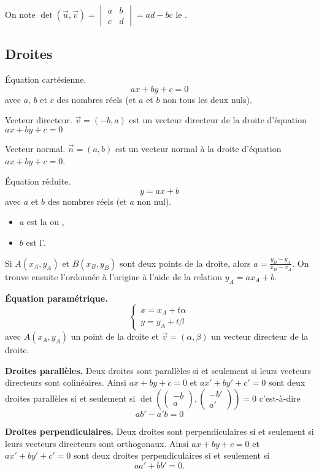 \documentclass[10pt,class=article,crop=false]{standalone}
\begin{document}
\begin{multicols}{2}
On note $\det (\vec u, \vec v) = \begin{vmatrix}
a & b \\
c & d
\end{vmatrix}
= ad - bc$ le .


\subsection{Droites}

Équation cartésienne. 
$$ax+by+c=0$$
avec $a$, $b$ et $c$ des nombres réels (et $a$ et $b$ non tous les deux nuls).

Vecteur directeur. $\vec v = (-b,a)$ est un vecteur directeur de la droite d'équation $ax+by+c=0$

Vecteur normal. $\vec n = (a,b)$ est un vecteur normal à la droite d'équation $ax+by+c=0$.


Équation réduite.
$$y = ax+b$$
avec $a$ et $b$ des nombres réels (et $a$ non nul).
\begin{itemize}
    \item $a$ est la  ou ,
    \item $b$ est l'.
\end{itemize}

Si $A(x_A,y_A)$ et $B(x_B,y_B)$ sont deux points de la droite, alors $a = \frac{y_B-y_A}{x_B-x_A}$.
On trouve ensuite l'ordonnée à l'origine à l'aide de la relation $y_A = a x_A+b$.

\textbf{Équation paramétrique.}
$$\begin{cases}
x = x_A + t \alpha \\
y = y_A + t \beta
\end{cases}$$
avec $A(x_A,y_A)$ un point de la droite et $\vec v = (\alpha,\beta)$ un vecteur directeur de la droite.


\textbf{Droites parallèles.}
Deux droites sont parallèles si et seulement si leurs vecteurs directeurs sont colinéaires.
Ainsi $ax+by+c=0$ et $ax'+by'+c'=0$ sont deux droites parallèles
si et seulement si 
$\det( \begin{pmatrix} -b \\ a\end{pmatrix},  \begin{pmatrix} -b' \\ a'\end{pmatrix}) = 0$ c'est-à-dire 
$$ab' - a'b=0$$

\textbf{Droites perpendiculaires.}
Deux droites sont perpendiculaires si et seulement si leurs vecteurs directeurs sont orthogonaux.
Ainsi $ax+by+c=0$ et $ax'+by'+c'=0$ sont deux droites perpendiculaires
si et seulement si 
$$aa' + bb'=0.$$ 

\end{multicols}
\end{document}
